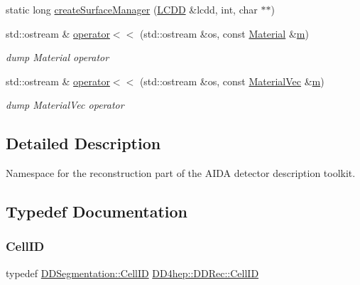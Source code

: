 \begin{DoxyCompactItemize}
\item 
static long \hyperlink{namespace_d_d4hep_1_1_d_d_rec_ac05724c87af6fb53f1305b968449c19b}{create\+Surface\+Manager} (\hyperlink{class_d_d4hep_1_1_geometry_1_1_l_c_d_d}{L\+C\+DD} \&lcdd, int, char $\ast$$\ast$)
\item 
std\+::ostream \& \hyperlink{namespace_d_d4hep_1_1_d_d_rec_ae8f5d05fd4ac3fcd53bc8f469f9b4ec4}{operator$<$$<$} (std\+::ostream \&os, const \hyperlink{class_d_d4hep_1_1_geometry_1_1_material}{Material} \&\hyperlink{_volumes_8cpp_a6fc379aaec47ce424b00d8ffda2a6c59}{m})
\begin{DoxyCompactList}\small\item\em dump Material operator \end{DoxyCompactList}\item 
std\+::ostream \& \hyperlink{namespace_d_d4hep_1_1_d_d_rec_a8e4fdb5e46547f315ba9b683d2b9e0e7}{operator$<$$<$} (std\+::ostream \&os, const \hyperlink{namespace_d_d4hep_1_1_d_d_rec_a69fdab2f851316d2b9e50956920359f7}{Material\+Vec} \&\hyperlink{_volumes_8cpp_a6fc379aaec47ce424b00d8ffda2a6c59}{m})
\begin{DoxyCompactList}\small\item\em dump Material\+Vec operator \end{DoxyCompactList}\end{DoxyCompactItemize}


\subsection{Detailed Description}
Namespace for the reconstruction part of the A\+I\+DA detector description toolkit. 

\subsection{Typedef Documentation}
\hypertarget{namespace_d_d4hep_1_1_d_d_rec_af5cecc2e566eeaedb430b92df23971d4}{}\label{namespace_d_d4hep_1_1_d_d_rec_af5cecc2e566eeaedb430b92df23971d4} 
\subsubsection{\texorpdfstring{Cell\+ID}{CellID}}
{\footnotesize\ttfamily typedef \hyperlink{namespace_d_d4hep_1_1_d_d_segmentation_ac7af071d85cb48820914434a07e21ba1}{D\+D\+Segmentation\+::\+Cell\+ID} \hyperlink{namespace_d_d4hep_1_1_d_d_rec_af5cecc2e566eeaedb430b92df23971d4}{D\+D4hep\+::\+D\+D\+Rec\+::\+Cell\+ID}}



